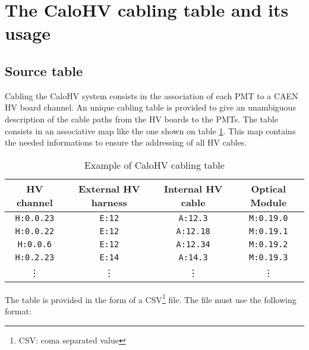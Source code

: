 
\clearpage
\section{The CaloHV cabling table and its usage}

\subsection{Source table}

Cabling the CaloHV system consists in the association of each PMT to a
CAEN HV  board channel.  An unique  cabling table is  provided to
give an unambiguous description of the  cable paths from the HV boards
to the  PMTs.  The table consists  in an associative map  like the one
shown on  table \ref{tab:calohv:map:1}.  This map contains  the needed
informations to ensure the addressing of all HV cables.

\begin{table}[h]
\begin{center}
\begin{tabular}{|c|c|c|c|}
  \hline
  \textbf{HV channel}& \textbf{External HV harness} & \textbf{Internal HV cable} & \textbf{Optical Module} \\
  \hline
  \hline
  \texttt{H:0.0.23}  & \texttt{E:12} & \texttt{A:12.3} & \texttt{M:0.19.0} \\
  \hline
  \texttt{H:0.0.22}  & \texttt{E:12} & \texttt{A:12.18} & \texttt{M:0.19.1} \\
  \hline
  \texttt{H:0.0.6}  & \texttt{E:12} & \texttt{A:12.34} & \texttt{M:0.19.2} \\
  \hline
  \texttt{H:0.2.23}  & \texttt{E:14} & \texttt{A:14.3} & \texttt{M:0.19.3} \\
  \hline
  \vdots          & \vdots  & \vdots   & \vdots             \\  
  \hline
\end{tabular}
\end{center}
\caption{Example of CaloHV cabling table}
\label{tab:calohv:map:1}
\end{table}

\par\noindent The table is provided in the form of a CSV\footnote{CSV:
  coma separated value} file.  The file must use the following format:

